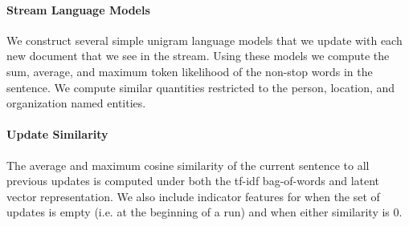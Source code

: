 \paragraph{Stream Language Models}
We construct several simple unigram language models that we update with 
each new document that we see in the stream. Using these models 
we compute the sum, average, and maximum token likelihood
of the non-stop words
in the sentence. We compute similar quantities restricted to
the person, location, and organization named entities.

\paragraph{Update Similarity} The average and maximum cosine similarity
of the current sentence to all previous updates is computed
under both the tf-idf bag-of-words and latent vector
representation. We also include indicator features for when
the set of updates is empty (i.e. at the beginning of a run) and
when either similarity is 0.



